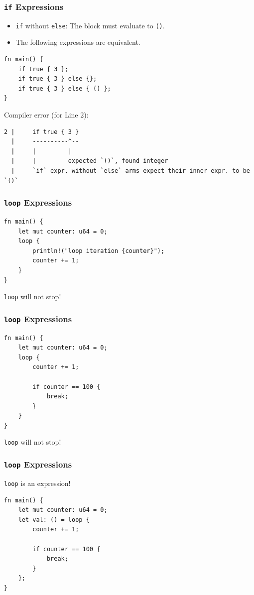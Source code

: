 \begin{frame}[fragile]
    \frametitle{\texttt{if} Expressions}
    \begin{itemize}
        \item \texttt{if} without \texttt{else}: The block must evaluate to \texttt{()}.
        \pause
        \vfill
        \item The following expressions are equivalent.
    \end{itemize}
    \begin{verbatim}
fn main() {
    if true { 3 };
    if true { 3 } else {};
    if true { 3 } else { () };
}
    \end{verbatim}
    \pause
    \vfill
    Compiler error (for Line 2):
    \begin{verbatim}
2 |     if true { 3 }
  |     ----------^--
  |     |         |
  |     |         expected `()`, found integer
  |     `if` expr. without `else` arms expect their inner expr. to be `()`
    \end{verbatim}
\end{frame}

\begin{frame}[fragile]
    \frametitle{\texttt{loop} Expressions}
    \begin{verbatim}
fn main() {
    let mut counter: u64 = 0;
    loop {
        println!("loop iteration {counter}");
        counter += 1;
    }
}
    \end{verbatim}
    \pause
    \vfill
    \texttt{loop} will not stop!
\end{frame}

\begin{frame}[fragile]
    \frametitle{\texttt{loop} Expressions}
    \begin{verbatim}
fn main() {
    let mut counter: u64 = 0;
    loop {
        counter += 1;

        if counter == 100 {
            break;
        }
    }
}
    \end{verbatim}
    \pause
    \vfill
    \texttt{loop} will not stop!
\end{frame}

\begin{frame}[fragile]
    \frametitle{\texttt{loop} Expressions}
    \texttt{loop} is an expression!
    \pause
    \vfill
    \begin{verbatim}
fn main() {
    let mut counter: u64 = 0;
    let val: () = loop {
        counter += 1;

        if counter == 100 {
            break;
        }
    };
}
    \end{verbatim}
\end{frame}

